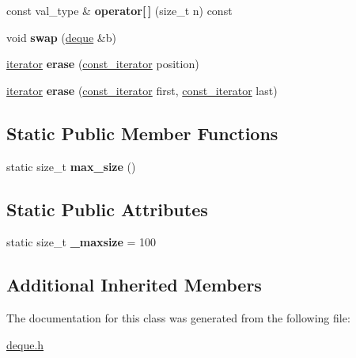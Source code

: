 \begin{DoxyCompactItemize}
const val\+\_\+type \& {\bfseries operator\mbox{[}$\,$\mbox{]}} (size\+\_\+t n) const
\item 
\hypertarget{classdeque_a58cf745ac219782f3454dbaf82169b62}{}\label{classdeque_a58cf745ac219782f3454dbaf82169b62} 
void {\bfseries swap} (\hyperlink{classdeque}{deque} \&b)
\item 
\hypertarget{classdeque_ad8c083d221d558daeef4e34f5fc7d742}{}\label{classdeque_ad8c083d221d558daeef4e34f5fc7d742} 
\hyperlink{structdeque__iterator}{iterator} {\bfseries erase} (\hyperlink{structdeque__iterator}{const\+\_\+iterator} position)
\item 
\hypertarget{classdeque_a9f2317bf487ca9ab7ab011bc9d99e214}{}\label{classdeque_a9f2317bf487ca9ab7ab011bc9d99e214} 
\hyperlink{structdeque__iterator}{iterator} {\bfseries erase} (\hyperlink{structdeque__iterator}{const\+\_\+iterator} first, \hyperlink{structdeque__iterator}{const\+\_\+iterator} last)
\end{DoxyCompactItemize}
\subsection*{Static Public Member Functions}
\begin{DoxyCompactItemize}
\item 
\hypertarget{classdeque_a91b6e22358519a9e5f73d1eac2da9947}{}\label{classdeque_a91b6e22358519a9e5f73d1eac2da9947} 
static size\+\_\+t {\bfseries max\+\_\+size} ()
\end{DoxyCompactItemize}
\subsection*{Static Public Attributes}
\begin{DoxyCompactItemize}
\item 
\hypertarget{classdeque_a280e7b5814351f71d303a6b590e40b49}{}\label{classdeque_a280e7b5814351f71d303a6b590e40b49} 
static size\+\_\+t {\bfseries \+\_\+maxsize} = 100
\end{DoxyCompactItemize}
\subsection*{Additional Inherited Members}


The documentation for this class was generated from the following file\+:\begin{DoxyCompactItemize}
\item 
\hyperlink{deque_8h}{deque.\+h}\end{DoxyCompactItemize}
